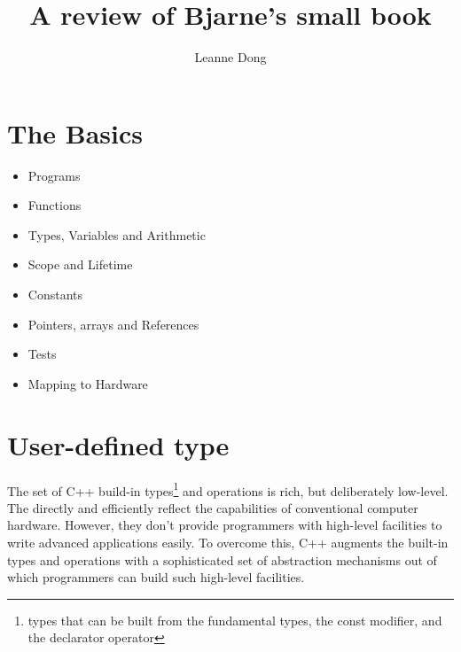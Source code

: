 \documentclass{article}
\title{A review of Bjarne's small book}
\author{Leanne Dong}
\begin{document}
	\maketitle
\section{The Basics}
\begin{itemize}
	\item Programs
	\item Functions
	\item Types, Variables and Arithmetic
	\item Scope and Lifetime
	\item Constants
	\item Pointers, arrays and References
	\item Tests
	\item Mapping to Hardware
\end{itemize}
\section{User-defined type}
The set of C++ build-in types\footnote{types that can be built from the fundamental types, the const modifier, and the declarator operator} and operations is rich, but deliberately low-level. The directly and efficiently reflect the capabilities of conventional computer hardware. However, they don't provide programmers with high-level facilities to write advanced applications easily. To overcome this, C++ augments the built-in types and operations with a sophisticated set of abstraction mechanisms out of which programmers can build such high-level facilities.
\end{document}

